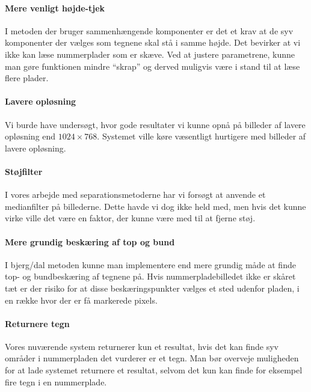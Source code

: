 \paragraph{Mere venligt højde-tjek}
I metoden der bruger sammenhængende komponenter er det et krav at de syv komponenter der vælges som tegnene skal stå i samme højde. Det bevirker at vi ikke kan læse nummerplader som er skæve. Ved at justere parametrene, kunne man gøre funktionen mindre ``skrap'' og derved muligvis være i stand til at læse flere plader.

\paragraph{Lavere opløsning}
Vi burde have undersøgt, hvor gode resultater vi kunne opnå på billeder af lavere opløsning end $1024 \times 768$. Systemet ville køre væsentligt hurtigere med billeder af lavere opløsning.


\paragraph{Støjfilter}
I vores arbejde med separationsmetoderne har vi forsøgt at anvende et medianfilter på billederne. Dette havde vi dog ikke held med, men hvis det kunne virke ville det være en faktor, der kunne være med til at fjerne støj.

\paragraph{Mere grundig beskæring af top og bund}
I bjerg/dal metoden kunne man implementere end mere grundig måde at finde top- og bundbeskæring af tegnene på. Hvis nummerpladebilledet ikke er skåret tæt er der risiko for at disse beskæringspunkter vælges et sted udenfor pladen, i en række hvor der er få markerede pixels.

\paragraph{Returnere tegn }
Vores nuværende system returnerer kun et resultat, hvis det kan finde syv områder i nummerpladen det vurderer er et tegn. Man bør overveje muligheden for at lade systemet returnere et resultat, selvom det kun kan finde for eksempel fire tegn i en nummerplade.


